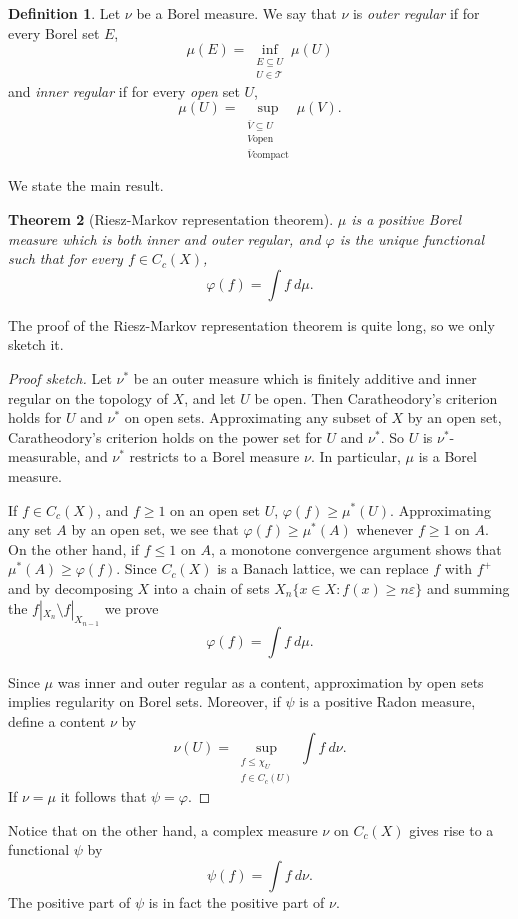 \documentclass[12pt]{report}
\newcommand{\dfn}[1]{\emph{#1}\index{#1}}
\newtheorem{theorem}{Theorem}[chapter]
\theoremstyle{definition}
\newtheorem{definition}[theorem]{Definition}
\begin{document}
\begin{definition}
    Let $\nu$ be a Borel measure. We say that $\nu$ is \dfn{outer regular} if for every Borel set $E$,
    $$\mu(E) = \inf_{\substack{E \subseteq U\\U \in \mathcal T}} \mu(U)$$
    and \dfn{inner regular} if for every \emph{open} set $U$,
    $$\mu(U) = \sup_{\substack{\overline V \subseteq U\\V \text{open}\\\overline V \text{compact}}} \mu(V).$$
\end{definition}
    We state the main result.
\begin{theorem}[Riesz-Markov representation theorem]
    $\mu$ is a positive Borel measure which is both inner and outer regular, and $\varphi$ is the unique functional such that for every $f \in C_c(X)$,
    $$\varphi(f) = \int f~d\mu.$$
\end{theorem}
    The proof of the Riesz-Markov representation theorem is quite long, so we only sketch it.
\begin{proof}[Proof sketch]
    Let $\nu^*$ be an outer measure which is finitely additive and inner regular on the topology of $X$, and let $U$ be open. Then Caratheodory's criterion holds for $U$ and $\nu^*$ on open sets. Approximating any subset of $X$ by an open set, Caratheodory's criterion holds on the power set for $U$ and $\nu^*$. So $U$ is $\nu^*$-measurable, and $\nu^*$ restricts to a Borel measure $\nu$. In particular, $\mu$ is a Borel measure.
    
    If $f \in C_c(X)$, and $f \geq 1$ on an open set $U$, $\varphi(f) \geq \mu^*(U)$. Approximating any set $A$ by an open set, we see that $\varphi(f) \geq \mu^*(A)$ whenever $f \geq 1$ on $A$. On the other hand, if $f \leq 1$ on $A$, a monotone convergence argument shows that $\mu^*(A) \geq \varphi(f)$. Since $C_c(X)$ is a Banach lattice, we can replace $f$ with $f^+$ and by decomposing $X$ into a chain of sets $X_n \{x \in X: f(x) \geq n\varepsilon\}$ and summing the $f|_{X_n} \setminus f|_{X_{n-1}}$ we prove
    $$\varphi(f) = \int f~d\mu.$$
    
    Since $\mu$ was inner and outer regular as a content, approximation by open sets implies regularity on Borel sets. Moreover, if $\psi$ is a positive Radon measure, define a content $\nu$ by
    $$\nu(U) = \sup_{\substack{f \leq \chi_U\\f \in C_c(U)}} \int f ~d\nu.$$
    If $\nu = \mu$ it follows that $\psi = \varphi$.
\end{proof}
    Notice that on the other hand, a complex measure $\nu$ on $C_c(X)$ gives rise to a functional $\psi$ by
    $$\psi(f) = \int f ~d\nu.$$
    The positive part of $\psi$ is in fact the positive part of $\nu$.
    
\end{document}

